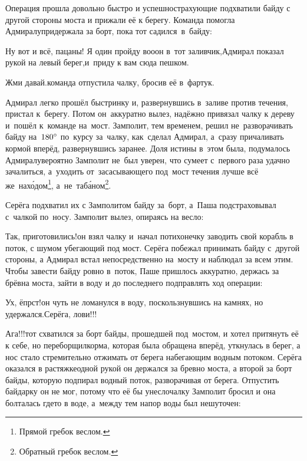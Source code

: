 Операция прошла довольно быстро и успешно\mdash страхующие подхватили байду с другой стороны моста и прижали её к берегу. Команда помогла Адмиралу\mdash придержала за борт, пока тот садился~в~байду:

\diagdash Ну вот и всё, пацаны! Я один пройду во\sdash о\sdash он в~тот заливчик,\mdash Адмирал показал рукой на левый берег,\mdash и~приду к вам сюда пешком.

\diagdash Жми давай.\mdash команда отпустила чалку, бросив её в~фартук.

\renewcommand*{\thefootnote}{\arabic{footnote}}
\setcounter{footnote}{0}

Адмирал легко прошёл быстринку и, развернувшись в~заливе против течения, пристал к~берегу. Потом он~аккуратно вылез, надёжно привязал чалку к дереву и~пошёл к~команде на~мост. Замполит, тем временем, решил не~разворачивать байду на~$180\degree$ по~курсу за~чалку, как~сделал Адмирал, а~сразу причаливать кормой вперёд, развернувшись заранее. Доля истины в~этом была, подумалось Адмиралу\mdash вероятно Замполит не~был уверен, что сумеет с~первого раза удачно зачалиться, а~уходить от~засасывающего под~мост течения лучше всё же~нах\'{о}дом\footnote{Прямой гребок веслом.}, а~не~таб\'{а}ном\footnote{Обратный гребок веслом.}. 

Серёга подхватил их с Замполитом байду за~борт, а~Паша подстраховывал с~чалкой по~носу. Замполит вылез, опираясь на весло:

\diagdash Так, приготовились!\mdash он взял чалку и~начал потихонечку заводить свой корабль в поток, с шумом убегающий под мост. Серёга побежал принимать байду с~другой стороны, а Адмирал встал непосредственно на~мосту и наблюдал за всем этим. Чтобы завести байду ровно в~поток, Паше пришлось аккуратно, держась за брёвна моста, зайти в воду и до последнего подправлять ход операции:

\diagdash Ух, ёпрст!\mdash он чуть не ломанулся в воду, поскользнувшись на камнях, но удержался.\mdash Серёга, лови!!!
 
\diagdash Ага!!!\mdash тот схватился за борт байды, прошедшей под~мостом, и хотел притянуть её к себе, но переборщил\mdash корма, которая была обращена вперёд, уткнулась в берег, а нос стало стремительно отжимать от берега набегающим водным потоком. Серёга оказался в растяжке\mdash одной рукой он держался за бревно моста, а второй за борт байды, которую подпирал водный поток, разворачивая от берега. Отпустить байдарку он не мог, потому что её бы унесло\mdash чалку Замполит бросил и она болталась где\sdash то в воде, а~между тем напор воды был нешуточен:

